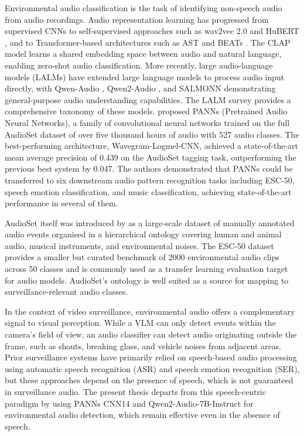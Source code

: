 Environmental audio classification is the task of identifying non-speech audio from audio recordings. Audio representation learning has progressed from supervised CNNs to self-supervised approaches such as wav2vec 2.0 \citep{baevski2020wav2vec2} and HuBERT \citep{hsu2021hubert}, and to Transformer-based architectures such as AST \citep{gong2021ast} and BEATs \citep{chen2023beats}. The CLAP model \citep{elizalde2023clap} learns a shared embedding space between audio and natural language, enabling zero-shot audio classification. More recently, large audio-language models (LALMs) have extended large language models to process audio input directly, with Qwen-Audio \citep{chu2023qwenaudio}, Qwen2-Audio \citep{chu2024qwen2audio}, and SALMONN \citep{tang2024salmonn} demonstrating general-purpose audio understanding capabilities. The LALM survey \citep{luo2026lalmsurvey} provides a comprehensive taxonomy of these models. \citet{kong2020panns} proposed PANNs (Pretrained Audio Neural Networks), a family of convolutional neural networks trained on the full AudioSet dataset of over five thousand hours of audio with 527 audio classes. The best-performing architecture, Wavegram-Logmel-CNN, achieved a state-of-the-art mean average precision of 0.439 on the AudioSet tagging task, outperforming the previous best system by 0.047. The authors demonstrated that PANNs could be transferred to six downstream audio pattern recognition tasks including ESC-50, speech emotion classification, and music classification, achieving state-of-the-art performance in several of them.

AudioSet itself was introduced by \citet{gemmeke2017audioset} as a large-scale dataset of manually annotated audio events organised in a hierarchical ontology covering human and animal audio, musical instruments, and environmental noises. The ESC-50 dataset \citep{piczak2015esc50} provides a smaller but curated benchmark of 2000 environmental audio clips across 50 classes and is commonly used as a transfer learning evaluation target for audio models. AudioSet's ontology is well suited as a source for mapping to surveillance-relevant audio classes.

In the context of video surveillance, environmental audio offers a complementary signal to visual perception. While a VLM can only detect events within the camera's field of view, an audio classifier can detect audio originating outside the frame, such as shouts, breaking glass, and vehicle noises from adjacent areas. Prior surveillance systems have primarily relied on speech-based audio processing using automatic speech recognition (ASR) and speech emotion recognition (SER), but these approaches depend on the presence of speech, which is not guaranteed in surveillance audio. The present thesis departs from this speech-centric paradigm by using PANNs CNN14 and Qwen2-Audio-7B-Instruct for environmental audio detection, which remain effective even in the absence of speech.

